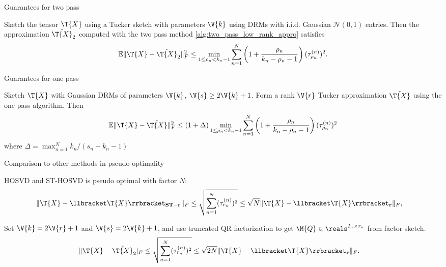 \documentclass[handout,xcolor={usenames,dvipsnames}]{beamer}
\begin{document}
\begin{frame}{Guarantees for two pass}
\begin{thm}
	\label{thm:low_rank_err_two_pass}
	Sketch the tensor $\T{X}$ using a Tucker sketch with parameters $\V{k}$
	using DRMs %
	with i.i.d. Gaussian $\mathcal N(0,1)$ entries.
	Then the approximation $\hat{\T{X}}_2$ computed with the two pass method \ref{alg:two_pass_low_rank_appro}
	satisfies
	\begin{equation*}
	\mathbb{E}\| \T{X} - \hat{\T{X}}_2 \|_F^2  \le  \min_{1\le \rho_n<k_n-1}
	\sum_{n=1}^N \left(1+\frac{\rho_n}{k_n-\rho_n-1}\right)(\tau^{(n)}_{\rho_n})^2.
	\end{equation*}
\end{thm}
\end{frame}


\begin{frame}{Guarantees for one pass}

\begin{thm}
	Sketch $\T{X}$ with Gaussian DRMs of parameters $\V{k}$, $\V{s} \geq 2\V{k}+1$.
	Form a rank $\V{r}$ Tucker approximation $\hat{\T{X}}$
	using the one pass algorithm.
	Then
	\begin{equation*}
	\mathbb{E}\| \T{X} - \hat{\T{X}} \|_F^2  \le  (1+\Delta) \min_{1\le \rho_n<k_n-1}
	\sum_{n=1}^N \left(1+\frac{\rho_n}{k_n-\rho_n-1}\right)(\tau^{(n)}_{\rho_n})^2
	\end{equation*}
	where $\Delta = \max_{n=1}^N k_n / (s_n-k_n-1)$
\end{thm}
\end{frame}


\begin{frame}{Comparison to other methods in pseudo optimality}
\bit 
\item HOSVD and ST-HOSVD is pseudo optimal with factor $N$:
\begin{equation}
\begin{aligned}
& \| \T{X}-\llbracket \T{X} \rrbracket _{\mathbf{ST-r}}\|_F \le  \sqrt{\sum_{n=1}^N (\tau^{(n)}_{r_n})^2} \le \sqrt{N} \|\T{X}-\llbracket \T{X} \rrbracket _{\mathbf{r}}\|_F, 
\end{aligned}
\end{equation}
\eit 

\bit 
\item Set $\V{k} = 2\V{r}+1$ and $\V{s} = 2\V{k}+1$,  and use truncated QR factorization to get $\M{Q}\in \reals^{I_n\times r_n}$ from factor sketch. 
\begin{equation}
\begin{aligned}
& \| \T{X}- \hat{\T{X}}_2 |_F \le  \sqrt{\sum_{n=1}^N (\tau^{(n)}_{r_n})^2} \le \sqrt{2N} \|\T{X}-\llbracket \T{X} \rrbracket _{\mathbf{r}}\|_F. 
\end{aligned}
\end{equation}
\eit 
\end{frame}
\end{document}
